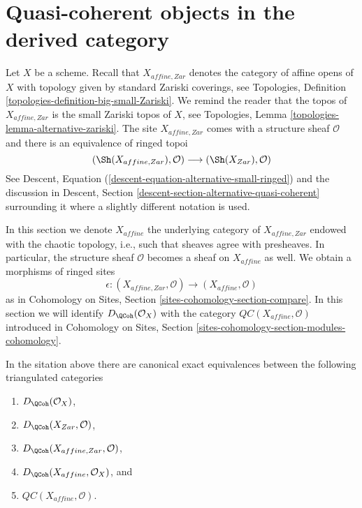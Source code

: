 \section{Quasi-coherent objects in the derived category}
\label{section-QC}

\noindent
Let $X$ be a scheme. Recall that $X_{affine, Zar}$
denotes the category of affine opens of $X$ with topology given
by standard Zariski coverings, see
Topologies, Definition \ref{topologies-definition-big-small-Zariski}.
We remind the reader that the topos of $X_{affine, Zar}$
is the small Zariski topos of $X$, see Topologies, Lemma
\ref{topologies-lemma-alternative-zariski}. The site $X_{affine, Zar}$
comes with a structure sheaf $\mathcal{O}$ and there is an
equivalence of ringed topoi
$$
(\Sh(X_{affine, Zar}), \mathcal{O})
\longrightarrow
(\Sh(X_{Zar}), \mathcal{O})
$$
See Descent, Equation (\ref{descent-equation-alternative-small-ringed})
and the discussion in
Descent, Section \ref{descent-section-alternative-quasi-coherent}
surrounding it where a slightly different notation is used.

\medskip\noindent
In this section we denote $X_{affine}$ the underlying category of
$X_{affine, Zar}$ endowed with the chaotic topology, i.e., such that sheaves
agree with presheaves. In particular, the structure sheaf $\mathcal{O}$
becomes a sheaf on $X_{affine}$ as well.
We obtain a morphisms of ringed sites
$$
\epsilon :
(X_{affine, Zar}, \mathcal{O})
\longrightarrow
(X_{affine}, \mathcal{O})
$$
as in Cohomology on Sites, Section \ref{sites-cohomology-section-compare}.
In this section we will identify $D_\QCoh(\mathcal{O}_X)$ with
the category $\mathit{QC}(X_{affine}, \mathcal{O})$ introduced in
Cohomology on Sites, Section \ref{sites-cohomology-section-modules-cohomology}.

\begin{lemma}
\label{lemma-DQCoh-alternative-small}
In the sitation above there are canonical exact equivalences between
the following triangulated categories
\begin{enumerate}
\item $D_\QCoh(\mathcal{O}_X)$,
\item $D_\QCoh(X_{Zar}, \mathcal{O})$,
\item $D_\QCoh(X_{affine, Zar}, \mathcal{O})$,
\item $D_\QCoh(X_{affine}, \mathcal{O}_X)$, and
\item $\mathit{QC}(X_{affine}, \mathcal{O})$.
\end{enumerate}
\end{lemma}

